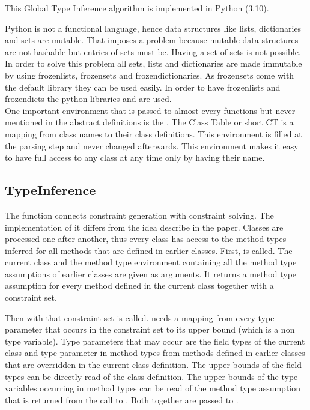 This Global Type Inference algorithm is implemented in Python (3.10).

Python is not a functional language, hence data structures like lists, dictionaries and sets are mutable. That imposes a problem because mutable data structures are not hashable but entries of sets must be. Having a set of sets is not possible.
In order to solve this problem all sets, lists and dictionaries are made immutable by using frozenlists, frozensets and frozendictionaries. As frozensets come with the default library they can be used easily. In order to have frozenlists and frozendicts the python libraries  and  are used.\\
One important environment that is passed to almost every functions but never mentioned in the abstract definitions is the . The Class Table or short CT is a mapping from class names to their class definitions. This environment is filled at the parsing step and never changed afterwards. This environment makes it easy to have full access to any class at any time only by having their name.\\

\subsection{TypeInference}

The function  connects constraint generation with constraint solving. The implementation of it differs from the idea describe in the paper.
Classes are processed one after another, thus every class has access to the method types inferred for all methods that are defined in earlier classes.
First,  is called. The current class and the method type environment containing all the method type assumptions of earlier classes are given as arguments. It returns a method type assumption for every
method defined in the current class together with a constraint set.

Then  with that constraint set is called.  needs a mapping from every type parameter that occurs in the constraint set to its upper bound (which is a non type variable).
Type parameters that may occur are the field types of the current class and type parameter in method types from methods defined in earlier classes that are overridden in the current class definition.
The upper bounds of the field types can be directly read of the class definition. The upper bounds of the type variables occurring in method types can be read of the method type assumption that is returned from the call to .
Both together are passed to .

